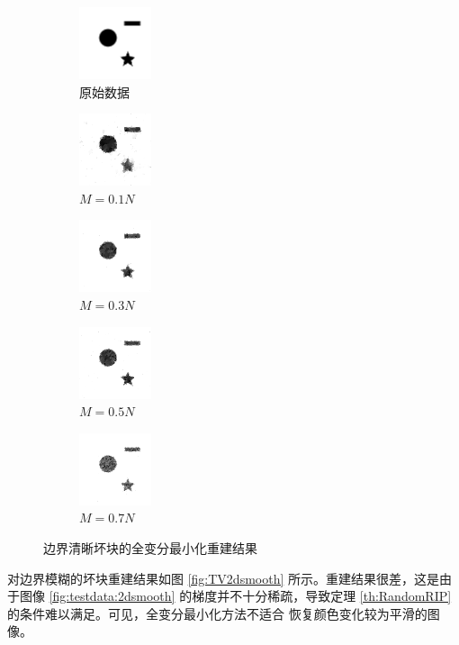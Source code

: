 \begin{figure}
\centering
\begin{subfigure}[t]{1.1in}
	\includegraphics{Figure/testdata/2dsharp.png}
	\caption{原始数据}
\end{subfigure}
\begin{subfigure}[t]{1.1in}
	\includegraphics{Figure/TV/2dsharp10.png}
	\caption{$M = 0.1 N$}
\end{subfigure}
\begin{subfigure}[t]{1.1in}
	\includegraphics{Figure/TV/2dsharp30.png}
	\caption{$M = 0.3 N$}
\end{subfigure}
\begin{subfigure}[t]{1.1in}
	\includegraphics{Figure/TV/2dsharp50.png}
	\caption{$M = 0.5 N$}
\end{subfigure}
\begin{subfigure}[t]{1.1in}
	\includegraphics{Figure/TV/2dsharp70.png}
	\caption{$M = 0.7 N$}
\end{subfigure}
\caption{边界清晰坏块的全变分最小化重建结果}
\label{fig:TV2dsharp}
\end{figure}

对边界模糊的坏块重建结果如图 \ref{fig:TV2dsmooth}
所示。重建结果很差，这是由于图像
\ref{fig:testdata:2dsmooth} 的梯度并不十分稀疏，导致定理
\ref{th:RandomRIP} 的条件难以满足。可见，全变分最小化方法不适合
恢复颜色变化较为平滑的图像。

